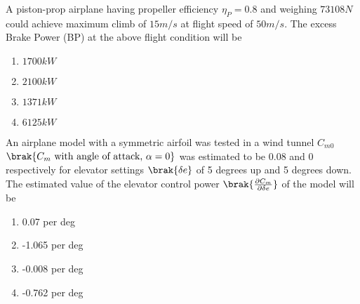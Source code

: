 \item A piston-prop airplane having propeller efficiency $\eta_P = 0.8$ and weighing $73108 N$
could achieve maximum climb of $15 m/s$ at flight speed of $50 m/s$. The excess Brake Power (BP)
at the above flight condition will be

\begin{multicols}{4}
    \begin{enumerate}
        \item $1700 kW$
        \item $2100 kW$
        \item $1371 kW$
        \item $6125 kW$
    \end{enumerate}
\end{multicols}

\item An airplane model with a symmetric airfoil was tested in a wind tunnel $C_{m0}$ $\brak{C_m\text{ with
angle of attack, }\alpha = 0}$ was estimated to be $0.08$ and $0$ respectively for elevator settings
$\brak{\delta e}$ of 5 degrees up and 5 degrees down. The estimated value of the elevator control power
$\brak{\frac{\partial C_m}{\partial \delta e}}$ of the model will be

\begin{multicols}{2}
    \begin{enumerate}
        \item 0.07 per deg
        \item -1.065 per deg
        \item -0.008 per deg
        \item -0.762 per deg
    \end{enumerate}
\end{multicols}
